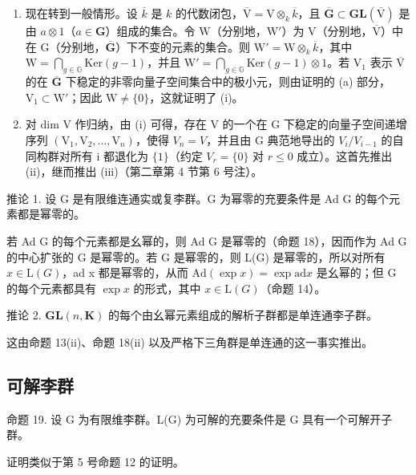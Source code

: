 \begin{enumerate}
\def\labelenumi{(\alph{enumi})}
\setcounter{enumi}{1}
\item
  现在转到一般情形。设 \(\overline{k}\) 是 \(k\) 的代数闭包，\(\overline{\mathrm{V}} = \mathrm{V} \otimes_k \overline{k}\)，且 \(\overline{\mathbf{G}} \subset \mathbf{GL}(\overline{\mathrm{V}})\) 是由 \(a \otimes 1\)（\(a \in \mathbf{G}\)）组成的集合。令 \(\mathrm{W}\)（分别地，\(\mathrm{W}'\)）为 \(\mathrm{V}\)（分别地，\(\overline{\mathrm{V}}\)）中在 \(\mathrm{G}\)（分别地，\(\overline{\mathbf{G}}\)）下不变的元素的集合。则 \(\mathrm{W}' = \mathrm{W} \otimes_k \overline{k}\)，其中 \(\mathrm{W} = \bigcap_{g \in \mathbb{G}} \mathrm{Ker}(g - 1)\)，并且 \(\mathrm{W}' = \bigcap_{g \in \mathbb{G}} \mathrm{Ker}(g - 1) \otimes 1\)。若 \(\mathrm{V}_1\) 表示 \(\overline{\mathrm{V}}\) 的在 \(\overline{\mathbf{G}}\) 下稳定的非零向量子空间集合中的极小元，则由证明的 (a) 部分，\(\mathrm{V}_1 \subset \mathrm{W}'\)；因此 \(\mathrm{W} \neq \{0\}\)，这就证明了 (i)。
\item
  对 dim V 作归纳，由 (i) 可得，存在 V 的一个在 G 下稳定的向量子空间递增序列 \(\left(\mathrm{V}_{1},\mathrm{V}_{2},\ldots,\mathrm{V}_{n}\right)\)，使得 \(V_{n}=V\)，并且由 G 典范地导出的 \(V_{i}/V_{i-1}\) 的自同构群对所有 i 都退化为 \(\{1\}\)（约定 \(V_{r}=\{0\}\) 对 \(r\leqslant0\) 成立）。这首先推出 (ii)，继而推出 (iii)（第二章第 4 节第 6 号注）。
\end{enumerate}

推论 1. 设 G 是有限维连通实或复李群。G 为幂零的充要条件是 Ad G 的每个元素都是幂零的。

若 Ad G 的每个元素都是幺幂的，则 Ad G 是幂零的（命题 18），因而作为 Ad G 的中心扩张的 G 是幂零的。若 G 是幂零的，则 L(G) 是幂零的，所以对所有 \(x \in \mathrm{L}(G)\)，ad x 都是幂零的，从而 \(\mathrm{Ad}(\exp x) = \exp \mathrm{ad} x\) 是幺幂的；但 G 的每个元素都具有 \(\exp x\) 的形式，其中 \(x \in \mathrm{L}(G)\)（命题 14）。

推论 2. \(\mathbf{GL}(n, \mathbf{K})\) 的每个由幺幂元素组成的解析子群都是单连通李子群。

这由命题 13(ii)、命题 18(ii) 以及严格下三角群是单连通的这一事实推出。

\subsection{可解李群}

命题 19. 设 G 为有限维李群。L(G) 为可解的充要条件是 G 具有一个可解开子群。

证明类似于第 5 号命题 12 的证明。

